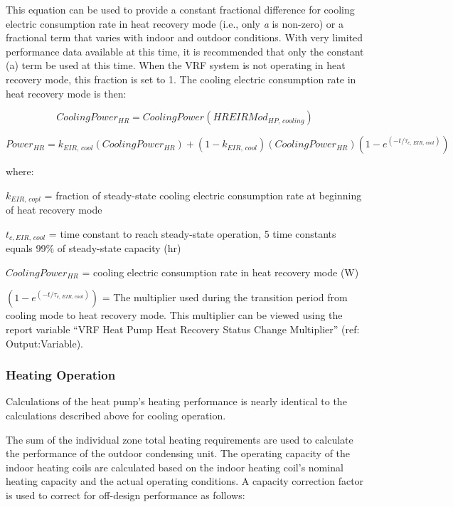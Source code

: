This equation can be used to provide a constant fractional difference for cooling electric consumption rate in heat recovery mode (i.e., only \emph{a} is non-zero) or a fractional term that varies with indoor and outdoor conditions. With very limited performance data available at this time, it is recommended that only the constant (a) term be used at this time. When the VRF system is not operating in heat recovery mode, this fraction is set to 1. The cooling electric consumption rate in heat recovery mode is then:

\begin{equation}
  CoolingPower_{HR} = CoolingPower \left( HREIRMod_{HP,\,cooling} \right)
\end{equation}

\begin{equation}
  Power_{HR} = k_{EIR,\,cool} \left( CoolingPower_{HR} \right) + \left( 1 - k_{EIR,\,cool} \right) \left( CoolingPower_{HR} \right) \left( 1 - e^{\left( -t / \tau_{c,\,EIR,\,cool} \right)} \right)
\end{equation}
  
where:

\(k_{EIR,\, copl}\) = fraction of steady-state cooling electric consumption rate at beginning of heat recovery mode

\(t_{c,EIR,\, cool}\) = time constant to reach steady-state operation, 5 time constants equals 99\% of steady-state capacity (hr)

\(CoolingPower_{HR}\) = cooling electric consumption rate in heat recovery mode (W)

\(\left( 1 - e^{\left( -t / \tau_{c,\,EIR,\,cool} \right)} \right)\) = The multiplier used during the transition period from cooling mode to heat recovery mode. This multiplier can be viewed using the report variable ``VRF Heat Pump Heat Recovery Status Change Multiplier'' (ref: Output:Variable).

\subsubsection{Heating Operation}\label{heating-operation-201605050924}

Calculations of the heat pump's heating performance is nearly identical to the calculations described above for cooling operation.

The sum of the individual zone total heating requirements are used to calculate the performance of the outdoor condensing unit. The operating capacity of the indoor heating coils are calculated based on the indoor heating coil's nominal heating capacity and the actual operating conditions. A capacity correction factor is used to correct for off-design performance as follows:

